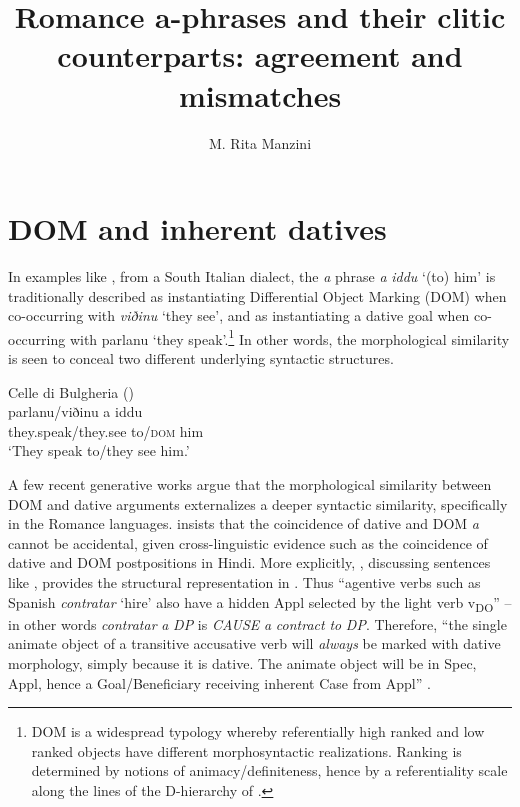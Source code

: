 \documentclass[output=paper,colorlinks,citecolor=brown]{./langscibook}
\author{M. Rita Manzini\affiliation{Università di Firenze}}
\title{Romance a-phrases and their clitic counterparts: agreement and mismatches}
\begin{document}
\maketitle 



\section{DOM and inherent datives}\label{sec:manzini:1}

In examples like , from a South Italian dialect, the \textit{a} phrase \textit{a} \textit{iddu} ‘(to) him’ is traditionally described as instantiating Differential Object Marking (DOM) when co-occurring with \textit{viðinu} ‘they see’, and as instantiating a dative goal when co-occurring with {parlanu} ‘they speak’.\footnote{DOM is a widespread typology \citep{Bossong1985} whereby referentially high ranked and low ranked objects have different morphosyntactic realizations. Ranking is determined by notions of animacy/definiteness, hence by a referentiality scale along the lines of the D-hierarchy of \citet{Kiparsky2008}.}   In other words, the morphological similarity is seen to conceal two different underlying syntactic structures.

\ea%
    \label{ex:manzini:1}
    {Celle di Bulgheria (\citealt{ManziniSavoia2005})}\\
    \gll parlanu/viðinu a iddu\\
        they.speak/they.see to/\textsc{dom} him\\
    \glt ‘They speak to/they see him.’        
\z

A few recent generative works argue that the morphological similarity between DOM and dative arguments externalizes a deeper syntactic similarity, specifically in the Romance languages. \citet{Torrego1998} insists that the coincidence of dative and DOM \textit{a} cannot be accidental, given cross-linguistic evidence such as the coincidence of dative and DOM postpositions in Hindi. More explicitly, \citet{Torrego2010}, discussing sentences like , provides the structural representation in . Thus “agentive verbs such as Spanish \textit{contratar} ‘hire’ also have a hidden Appl selected by the light verb v\textsubscript{DO}” – in other words \textit{contratar} \textit{a} \textit{DP} is \textit{CAUSE} \textit{a} \textit{contract} \textit{to} \textit{DP}. Therefore, “the single animate object of a transitive accusative verb will \textit{always} be marked with dative morphology, simply because it is dative. The animate object will be in Spec, Appl, hence a Goal/Beneficiary receiving inherent Case from Appl” \citep[462]{Torrego2010}. 
\end{document}
